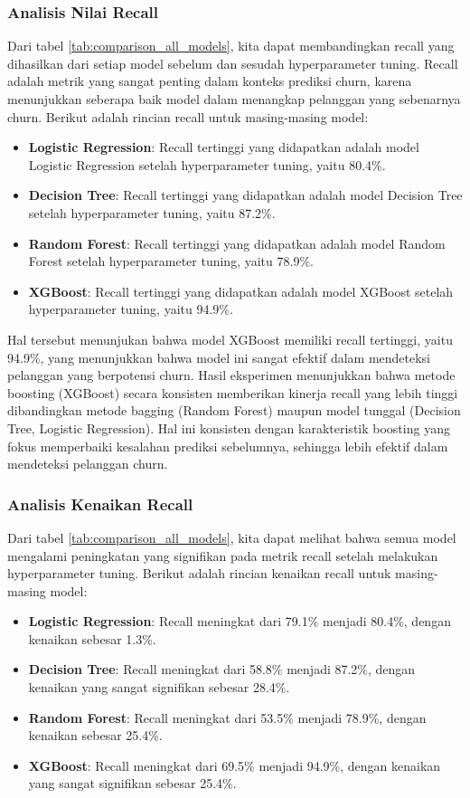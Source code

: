 \subsubsection{Analisis Nilai Recall}
Dari tabel \ref{tab:comparison_all_models}, kita dapat membandingkan recall yang dihasilkan dari setiap model sebelum dan sesudah hyperparameter tuning. Recall adalah metrik yang sangat penting dalam konteks prediksi churn, karena menunjukkan seberapa baik model dalam menangkap pelanggan yang sebenarnya churn. Berikut adalah rincian recall untuk masing-masing model:
\begin{itemize}
    \item \textbf{Logistic Regression}: Recall tertinggi yang didapatkan adalah model Logistic Regression setelah hyperparameter tuning, yaitu 80.4\%.
    \item \textbf{Decision Tree}: Recall tertinggi yang didapatkan adalah model Decision Tree setelah hyperparameter tuning, yaitu 87.2\%.
    \item \textbf{Random Forest}: Recall tertinggi yang didapatkan adalah model Random Forest setelah hyperparameter tuning, yaitu 78.9\%.
    \item \textbf{XGBoost}: Recall tertinggi yang didapatkan adalah model XGBoost setelah hyperparameter tuning, yaitu 94.9\%.
\end{itemize}
Hal tersebut menunjukan bahwa model XGBoost memiliki recall tertinggi, yaitu 94.9\%, yang menunjukkan bahwa model ini sangat efektif dalam mendeteksi pelanggan yang berpotensi churn. Hasil eksperimen menunjukkan bahwa metode boosting (XGBoost) secara konsisten memberikan kinerja recall yang lebih tinggi dibandingkan metode bagging (Random Forest) maupun model tunggal (Decision Tree, Logistic Regression). Hal ini konsisten dengan karakteristik boosting yang fokus memperbaiki kesalahan prediksi sebelumnya, sehingga lebih efektif dalam mendeteksi pelanggan churn.

\subsubsection{Analisis Kenaikan Recall}
Dari tabel \ref{tab:comparison_all_models}, kita dapat melihat bahwa semua model mengalami peningkatan yang signifikan pada metrik recall setelah melakukan hyperparameter tuning. Berikut adalah rincian kenaikan recall untuk masing-masing model:

\begin{itemize}
    \item \textbf{Logistic Regression}: Recall meningkat dari 79.1\% menjadi 80.4\%, dengan kenaikan sebesar 1.3\%.
    \item \textbf{Decision Tree}: Recall meningkat dari 58.8\% menjadi 87.2\%, dengan kenaikan yang sangat signifikan sebesar 28.4\%.
    \item \textbf{Random Forest}: Recall meningkat dari 53.5\% menjadi 78.9\%, dengan kenaikan sebesar 25.4\%.
    \item \textbf{XGBoost}: Recall meningkat dari 69.5\% menjadi 94.9\%, dengan kenaikan yang sangat signifikan sebesar 25.4\%.
\end{itemize}

